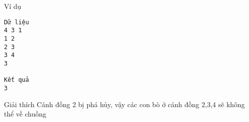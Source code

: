 Ví dụ  
\begin{verbatim}
Dữ liệu
4 3 1
1 2
2 3
3 4
3

Kết quả
3
\end{verbatim}
   Giải thích  
Cánh đồng 2 bị phá hủy, vậy các con bò ở cánh đồng 2,3,4 sẽ không thể về chuồng